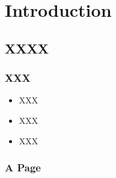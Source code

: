 \documentclass{beamer}
\title{\talktitle}
\author{\Us}
\date{\talkdate}
\begin{document}
\begin{frame}
  \titlepage
  \conferencebanner
\end{frame}

\section[Outline]{}
\begin{frame}
  \tableofcontents
\end{frame}

\section{Introduction}
\subsection{XXXX}
\begin{frame}
  \frametitle{XXX}

  \begin{itemize}
  \item<1-> XXX
  \item<2-> XXX
  \item<3-> XXX      
  \end{itemize}
\end{frame}

\begin{frame}
  \sudokuexampleone
\end{frame}

\begin{frame}[fragile]
\frametitle{A Page}



\end{frame}
\end{document}
